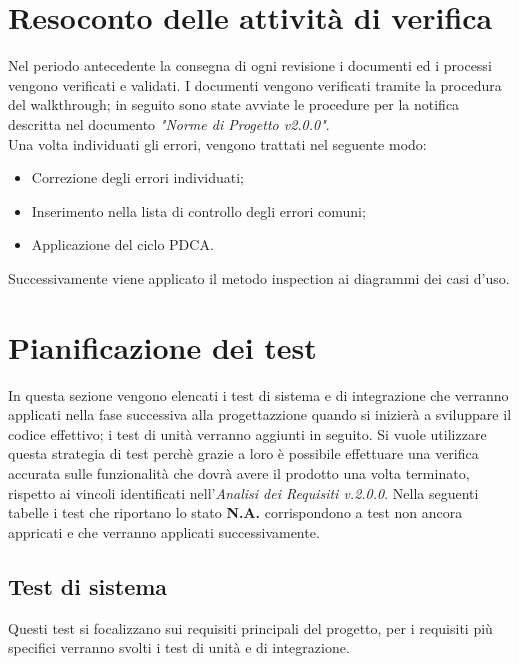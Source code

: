 \documentclass[12pt,a4paper,titlepage]{article}
\begin{document}
	\newpage
	\section{Resoconto delle attività di verifica}
	Nel periodo antecedente la consegna di ogni revisione i documenti ed i processi vengono verificati e validati. I documenti vengono verificati tramite la procedura del walkthrough; in seguito sono state avviate le procedure per la notifica descritta nel documento \textit{"Norme di Progetto v2.0.0"}.\\
	Una volta individuati gli errori, vengono trattati nel seguente modo:
	\begin{itemize}
		\item Correzione degli errori individuati;
		\item Inserimento nella lista di controllo degli errori comuni;
		\item Applicazione del ciclo PDCA.
	\end{itemize}
	Successivamente viene applicato il metodo inspection ai diagrammi dei casi d'uso.
	
	\newpage
	\section{Pianificazione dei test}
	In questa sezione vengono elencati i test di sistema e di integrazione che verranno applicati nella fase successiva alla progettazzione quando si inizierà a sviluppare il codice effettivo; i test di unità verranno aggiunti in seguito.
	Si vuole utilizzare questa strategia di test perchè grazie a loro è possibile effettuare una verifica accurata sulle funzionalità che dovrà avere il prodotto una volta terminato, rispetto ai vincoli identificati nell'\textit{Analisi dei Requisiti v.2.0.0}.
	Nella seguenti tabelle i test che riportano lo stato \textbf{N.A.} corrispondono a test non ancora appricati e che verranno applicati successivamente.
	
	\subsection{Test di sistema}
	Questi test si focalizzano sui requisiti principali del progetto, per i requisiti più specifici verranno svolti i test di unità e di integrazione.
	
\end{document}
